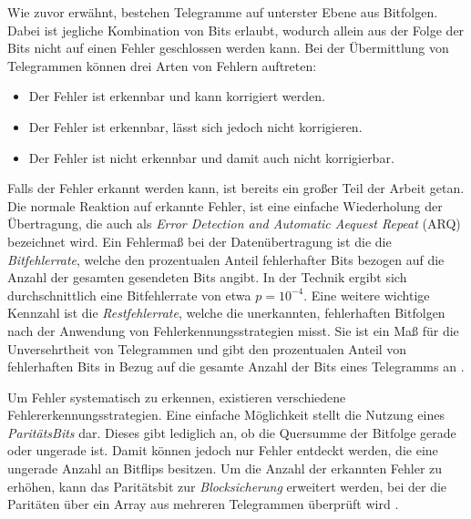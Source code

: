 Wie zuvor erwähnt, bestehen Telegramme auf unterster Ebene aus Bitfolgen. Dabei ist jegliche Kombination von Bits erlaubt, wodurch allein aus der Folge der Bits nicht auf einen Fehler geschlossen werden kann.
Bei der Übermittlung von Telegrammen können drei Arten von Fehlern auftreten:
\begin{itemize}
	\item Der Fehler ist erkennbar und kann korrigiert werden.
	\item Der Fehler ist erkennbar, lässt sich jedoch nicht korrigieren.
	\item Der Fehler ist nicht erkennbar und damit auch nicht korrigierbar.
\end{itemize}
Falls der Fehler erkannt werden kann, ist bereits ein großer Teil der Arbeit getan. Die normale Reaktion auf erkannte Fehler, ist eine einfache Wiederholung der Übertragung, die auch als \textit{Error Detection and Automatic Aequest Repeat} (ARQ) bezeichnet wird.
Ein Fehlermaß bei der Datenübertragung ist die die \textit{Bitfehlerrate}, welche den prozentualen Anteil fehlerhafter Bits bezogen auf die Anzahl der gesamten gesendeten Bits angibt. In der Technik ergibt sich durchschnittlich eine Bitfehlerrate von etwa $p=10^{-4}$. 
Eine weitere wichtige Kennzahl ist die \textit{Restfehlerrate}, welche die unerkannten, fehlerhaften Bitfolgen nach der Anwendung von Fehlerkennungsstrategien misst. Sie ist ein Maß für die Unversehrtheit von Telegrammen und gibt den prozentualen Anteil von fehlerhaften Bits in Bezug auf die gesamte Anzahl der Bits eines Telegramms an \cite[S.~31ff.]{schn06}.

Um Fehler systematisch zu erkennen, existieren verschiedene Fehlererkennungsstrategien. Eine einfache Möglichkeit stellt die Nutzung eines \textit{ParitätsBits} dar. Dieses gibt lediglich an, ob die Quersumme der Bitfolge gerade oder ungerade ist. Damit können jedoch nur Fehler entdeckt werden, die eine ungerade Anzahl an Bitflips besitzen. Um die Anzahl der erkannten Fehler zu erhöhen, kann das Paritätsbit zur \textit{Blocksicherung} erweitert werden, bei der die Paritäten über ein Array aus mehreren Telegrammen überprüft wird \cite[S.~34f.]{schn06}.

